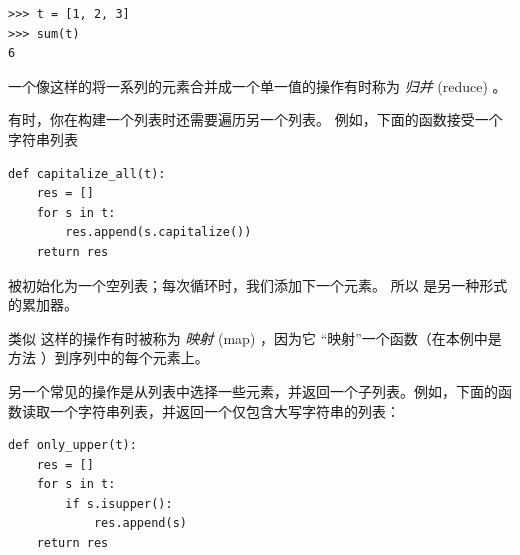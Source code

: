 \begin{lstlisting}
>>> t = [1, 2, 3]
>>> sum(t)
6
\end{lstlisting}
%

一个像这样的将一系列的元素合并成一个单一值的操作有时称为 {\em 归并} (reduce) 。

  


有时，你在构建一个列表时还需要遍历另一个列表。  例如，下面的函数接受一个字符串列表

\begin{lstlisting}
def capitalize_all(t):
    res = []
    for s in t:
        res.append(s.capitalize())
    return res
\end{lstlisting}

%

 被初始化为一个空列表；每次循环时，我们添加下一个元素。
所以  是另一种形式的累加器。



类似  这样的操作有时被称为 {\em 映射} (map) ，因为它 ``映射''一个函数（在本例中是方法  ）到序列中的每个元素上。

  
  


另一个常见的操作是从列表中选择一些元素，并返回一个子列表。例如，下面的函数读取一个字符串列表，并返回一个仅包含大写字符串的列表：

\begin{lstlisting}
def only_upper(t):
    res = []
    for s in t:
        if s.isupper():
            res.append(s)
    return res
\end{lstlisting}

